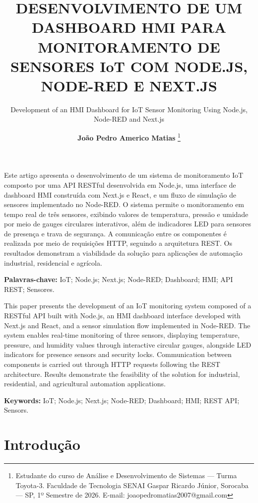 \documentclass[12pt]{unisenaiclass}
\title{DESENVOLVIMENTO DE UM DASHBOARD HMI PARA MONITORAMENTO DE SENSORES IoT COM NODE.JS, NODE-RED E NEXT.JS}
\subtitle{Development of an HMI Dashboard for IoT Sensor Monitoring Using Node.js, Node-RED and Next.js}
\author{
    \textbf{João Pedro Americo Matias} \thanks{Estudante do curso de Análise e Desenvolvimento de Sistemas — Turma Toyota-3. Faculdade de Tecnologia SENAI Gaspar Ricardo Júnior, Sorocaba — SP, 1º Semestre de 2026. E-mail: joaopedromatias2007@gmail.com}
}
\begin{document}
\maketitle

\begin{resumo}
Este artigo apresenta o desenvolvimento de um sistema de monitoramento IoT composto por uma API RESTful desenvolvida em Node.js, uma interface de dashboard HMI construída com Next.js e React, e um fluxo de simulação de sensores implementado no Node-RED. O sistema permite o monitoramento em tempo real de três sensores, exibindo valores de temperatura, pressão e umidade por meio de gauges circulares interativos, além de indicadores LED para sensores de presença e trava de segurança. A comunicação entre os componentes é realizada por meio de requisições HTTP, seguindo a arquitetura REST. Os resultados demonstram a viabilidade da solução para aplicações de automação industrial, residencial e agrícola.
\end{resumo}

\begin{justify}
    \textbf{Palavras-chave:} IoT; Node.js; Next.js; Node-RED; Dashboard; HMI; API REST; Sensores.
\end{justify}

\begin{abstract1}
This paper presents the development of an IoT monitoring system composed of a RESTful API built with Node.js, an HMI dashboard interface developed with Next.js and React, and a sensor simulation flow implemented in Node-RED. The system enables real-time monitoring of three sensors, displaying temperature, pressure, and humidity values through interactive circular gauges, alongside LED indicators for presence sensors and security locks. Communication between components is carried out through HTTP requests following the REST architecture. Results demonstrate the feasibility of the solution for industrial, residential, and agricultural automation applications.
\end{abstract1}

\begin{justify}
    \textbf{Keywords:} IoT; Node.js; Next.js; Node-RED; Dashboard; HMI; REST API; Sensors.
\end{justify}



\section{Introdução}
\end{document}
